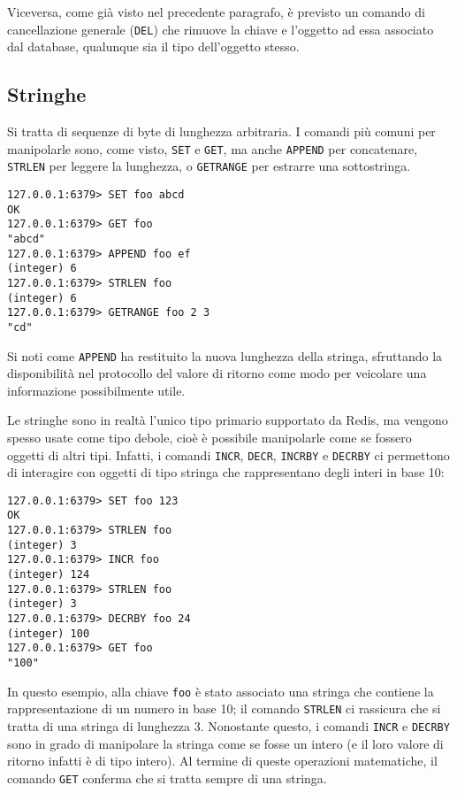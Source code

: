 Viceversa, come già visto nel precedente paragrafo, è previsto un comando di cancellazione
generale (\verb|DEL|) che rimuove la chiave e l'oggetto ad essa associato dal database,
qualunque sia il tipo dell'oggetto stesso.


\subsection{Stringhe}

Si tratta di sequenze di byte di lunghezza arbitraria. I comandi
più comuni per manipolarle sono, come visto, \verb|SET| e \verb|GET|, ma anche \verb|APPEND|
per concatenare, \verb|STRLEN| per leggere la lunghezza, o \verb|GETRANGE| per estrarre una
sottostringa.

\medskip
\begin{lstlisting}
127.0.0.1:6379> SET foo abcd
OK
127.0.0.1:6379> GET foo
"abcd"
127.0.0.1:6379> APPEND foo ef
(integer) 6
127.0.0.1:6379> STRLEN foo
(integer) 6
127.0.0.1:6379> GETRANGE foo 2 3
"cd"
\end{lstlisting}

Si noti come \verb|APPEND| ha restituito la nuova lunghezza della stringa, sfruttando
la disponibilità nel protocollo del valore di ritorno come modo per veicolare una
informazione possibilmente utile.

Le stringhe sono in realtà l'unico tipo primario supportato da Redis, ma vengono spesso usate come tipo
debole, cioè è possibile manipolarle come se fossero oggetti di altri tipi. Infatti,
i comandi \verb|INCR|, \verb|DECR|,  \verb|INCRBY| e \verb|DECRBY| ci permettono
di interagire con oggetti di tipo stringa che rappresentano degli interi in base 10:

\medskip
\begin{lstlisting}
127.0.0.1:6379> SET foo 123
OK
127.0.0.1:6379> STRLEN foo
(integer) 3
127.0.0.1:6379> INCR foo
(integer) 124
127.0.0.1:6379> STRLEN foo
(integer) 3
127.0.0.1:6379> DECRBY foo 24
(integer) 100
127.0.0.1:6379> GET foo
"100"
\end{lstlisting}

In questo esempio, alla chiave \verb|foo| è stato associato una stringa che contiene
la rappresentazione di un numero in base 10; il comando \verb|STRLEN| ci rassicura
che si tratta di una stringa di lunghezza 3. Nonostante questo, i comandi \verb|INCR|
e \verb|DECRBY| sono in grado di manipolare la stringa come se fosse un intero (e il
loro valore di ritorno infatti è di tipo intero). Al termine di queste operazioni
matematiche, il comando \verb|GET| conferma che si tratta sempre di una stringa.

